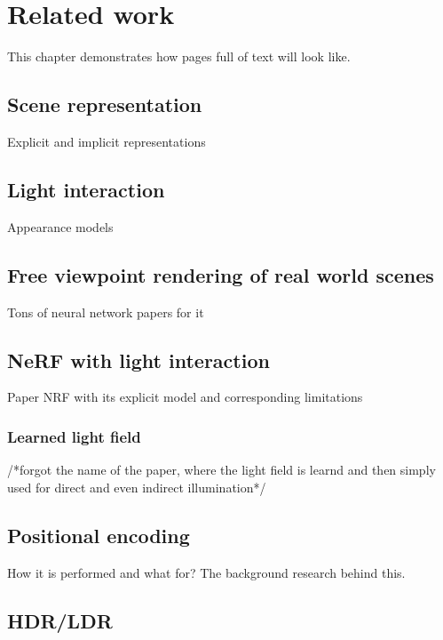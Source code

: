 \chapter{Related work}
\label{chap:related_work}

This chapter demonstrates how pages full of text will look like.


\section{Scene representation}

Explicit and implicit representations




\section{Light interaction}

Appearance models




\section{Free viewpoint rendering of real world scenes}

Tons of neural network papers for it





\section{NeRF with light interaction}

Paper NRF with its explicit model and corresponding limitations

\subsection{Learned light field}

/*forgot the name of the paper, where the light field is learnd and then simply used for direct and even indirect illumination*/




\section{Positional encoding}

How it is performed and what for? The background research behind this.


\section{HDR/LDR}

